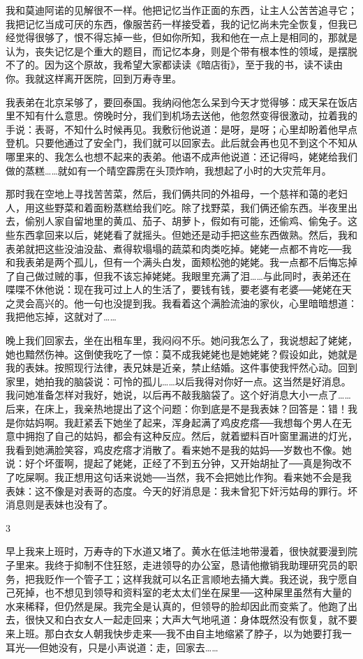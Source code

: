 我和莫迪阿诺的见解很不一样。他把记忆当作正面的东西，让主人公苦苦追寻它；我把记忆当成可厌的东西，像服苦药一样接受着，我的记忆尚未完全恢复，但我已经觉得很够了，恨不得忘掉一些，但如你所知，我和他在一点上是相同的，那就是认为，丧失记忆是个重大的题目，而记忆本身，则是个带有根本性的领域，是摆脱不了的。因为这个原故，我希望大家都读读《暗店街》，至于我的书，读不读由你。我就这样离开医院，回到万寿寺里。 

我表弟在北京呆够了，要回泰国。我纳闷他怎么呆到今天才觉得够：成天呆在饭店里不知有什么意思。傍晚时分，我们到机场去送他，他忽然变得很激动，拉着我的手说：表哥，不知什么时候再见。我敷衍他说道：是呀，是呀；心里却盼着他早点登机。只要他通过了安全门，我们就可以回家去。此后就会再也见不到这个不知从哪里来的、我怎么也想不起来的表弟。他语不成声他说道：还记得吗，姥姥给我们做的蒸糕……就如有一个晴空霹雳在头顶炸响，我想起了小时的大灾荒年月。 

那时我在空地上寻找苦苦菜，然后，我们俩共同的外祖母，一个慈祥和蔼的老妇人，用这些野菜和着面粉蒸糕给我们吃。除了找野菜，我们俩还偷东西。半夜里出去，偷别人家自留地里的黄瓜、茄子、胡萝卜，假如有可能，还偷鸡、偷兔子。这些东西拿回来以后，姥姥看了就摇头。但她还是动手把这些东西做熟。然后，我和表弟就把这些没油没盐、煮得软塌塌的蔬菜和肉类吃掉。姥姥一点都不肯吃──我和我表弟是两个孤儿，但有一个满头白发，面颊松弛的姥姥。我一点都不后悔忘掉了自己做过贼的事，但我不该忘掉姥姥。我眼里充满了泪……与此同时，表弟还在喋喋不休他说：现在我可过上人的生活了，要钱有钱，要老婆有老婆──姥姥在天之灵会高兴的。他一句也没提到我。我看着这个满脸流油的家伙，心里暗暗想道：我把他忘掉，这就对了…… 

晚上我们回家去，坐在出租车里，我闷闷不乐。她问我怎么了，我说想起了姥姥，她也黯然伤神。这倒使我吃了一惊：莫不成我姥姥也是她姥姥？假设如此，她就是我的表妹。按照现行法律，表兄妹是近亲，禁止结婚。这件事使我怦然心动。回到家里，她拍我的脑袋说：可怜的孤儿……以后我得对你好一点。这当然是好消息。我问她准备怎样对我好，她说，以后再不敲我脑袋了。这个好消息大小一点了……后来，在床上，我亲热地提出了这个问题：你到底是不是我表妹？回答是：错！我是你姑妈啊。我赶紧丢下她坐了起来，浑身起满了鸡皮疙瘩──我想每个男人在无意中拥抱了自己的姑妈，都会有这种反应。然后，就着塑料百叶窗里漏进的灯光，我看到她满脸笑容，鸡皮疙瘩才消散了。看来她不是我的姑妈──岁数也不像。她说：好个坏蛋啊，提起了姥姥，正经了不到五分钟，又开始胡扯了──真是狗改不了吃屎啊。我正想用这句话来说她──当然，我不会把她比作狗。看来她不会是我表妹：这不像是对表哥的态度。今天的好消息是：我未曾犯下奸污姑母的罪行。坏消息则是表妹也没有了。 

3 

早上我来上班时，万寿寺的下水道又堵了。黄水在低洼地带漫着，很快就要漫到院子里来。我终于抑制不住狂怒，走进领导的办公室，恳请他撤销我助理研究员的职务，把我贬作一个管子工；这样我就可以名正言顺地去捅大粪。我还说，我宁愿自己死掉，也不想见到领导和资料室的老太太们坐在屎里──这种屎里虽然有大量的水来稀释，但仍然是屎。我完全是认真的，但领导的脸却因此而变紫了。他跑了出去，很快又和白衣女人一起走回来；大声大气地吼道：身体既然没有恢复，就不要来上班。那白衣女人朝我快步走来──我不由自主地缩紧了脖子，以为她要打我一耳光──但她没有，只是小声说道：走，回家去…… 

